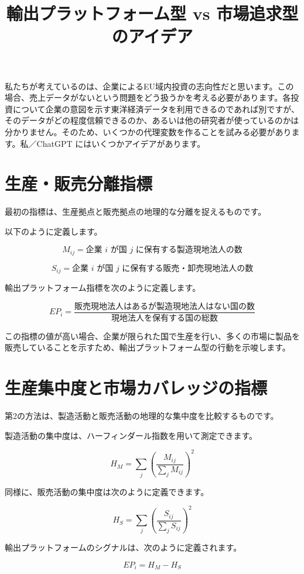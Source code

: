 \documentclass[11pt]{article}
\title{輸出プラットフォーム型 vs 市場追求型のアイデア}
\date{}
\begin{document}
\maketitle

私たちが考えているのは、企業によるEU域内投資の志向性だと思います。この場合、売上データがないという問題をどう扱うかを考える必要があります。各投資について企業の意図を示す東洋経済データを利用できるのであれば別ですが、そのデータがどの程度信頼できるのか、あるいは他の研究者が使っているのかは分かりません。そのため、いくつかの代理変数を作ることを試みる必要があります。私／ChatGPT にはいくつかアイデアがあります。

\section{生産・販売分離指標}

最初の指標は、生産拠点と販売拠点の地理的な分離を捉えるものです。

以下のように定義します。

\[
M_{ij} = \text{企業 } i \text{ が国 } j \text{ に保有する製造現地法人の数}
\]

\[
S_{ij} = \text{企業 } i \text{ が国 } j \text{ に保有する販売・卸売現地法人の数}
\]

輸出プラットフォーム指標を次のように定義します。

\[
EP_i =
\frac{\text{販売現地法人はあるが製造現地法人はない国の数}}
{\text{現地法人を保有する国の総数}}
\]

この指標の値が高い場合、企業が限られた国で生産を行い、多くの市場に製品を販売していることを示すため、輸出プラットフォーム型の行動を示唆します。

\section{生産集中度と市場カバレッジの指標}

第2の方法は、製造活動と販売活動の地理的な集中度を比較するものです。

製造活動の集中度は、ハーフィンダール指数を用いて測定できます。

\[
H_M = \sum_j
\left(
\frac{M_{ij}}{\sum_j M_{ij}}
\right)^2
\]

同様に、販売活動の集中度は次のように定義できます。

\[
H_S = \sum_j
\left(
\frac{S_{ij}}{\sum_j S_{ij}}
\right)^2
\]

輸出プラットフォームのシグナルは、次のように定義されます。

\[
EP_i = H_M - H_S
\]
\end{document}
